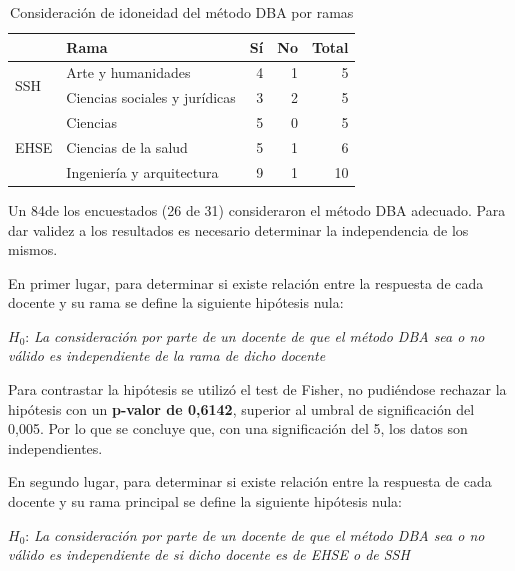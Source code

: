 \begin{table}[H]
  \begin{center}
  \begin{tabular}{| l | l | r | r | r |}
    \hline
    & Rama & Sí & No & Total \\
    \hline
    \hline
    \multirow{2}{2.5cm}{SSH} & Arte y humanidades & 4 & 1 & 5  \\
    \cline{2-5}
    & Ciencias sociales y jurídicas & 3 & 2 & 5  \\
    \hline
    \multirow{3}{2.5cm}{EHSE} & Ciencias & 5 & 0 & 5  \\
    \cline{2-5}
    & Ciencias de la salud & 5 & 1 & 6  \\
    \cline{2-5}
    & Ingeniería y arquitectura & 9 & 1 & 10 \\
    \hline
  \end{tabular}
\end{center}
\caption{Consideración de idoneidad del método DBA por ramas}
\label{tab:evalmetodo:encuesta:metodoDBA:rama}
\end{table}

Un 84\percentage{ }de los encuestados (26 de 31) consideraron el método DBA adecuado. Para dar validez a los resultados es necesario determinar la independencia de los mismos.

En primer lugar, para determinar si existe relación entre la respuesta de cada docente y su rama se define la siguiente hipótesis nula:

\medskip
\begin{mdframed}[style=hipotesis0]
$H_0$: \emph{La consideración por parte de un docente de que el método DBA sea o no válido es independiente de la rama de dicho docente}
\end{mdframed}

\medskip
Para contrastar la hipótesis se utilizó el test de Fisher, no pudiéndose rechazar la hipótesis con un \textbf{p-valor de 0,6142}, superior al umbral de significación del 0,005. Por lo que se concluye que, con una significación del 5\percentage, los datos son independientes.

En segundo lugar, para determinar si existe relación entre la respuesta de cada docente y su rama principal se define la siguiente hipótesis nula:

\medskip
\begin{mdframed}[style=hipotesis0]
$H_0$: \emph{La consideración por parte de un docente de que el método DBA sea o no válido es independiente de si dicho docente es de EHSE o de SSH}
\end{mdframed}

